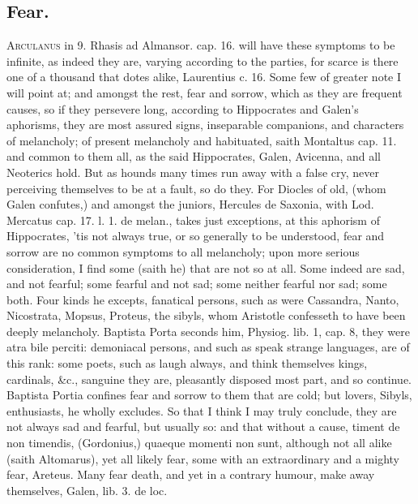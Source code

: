 {\subsection{Fear.}
\lettrine{A}{rculanus} in 9. Rhasis ad Almansor. cap. 16. will have these
symptoms to be infinite, as indeed they are, varying according to the
parties, for scarce is there one of a thousand that dotes alike, 
Laurentius c. 16. Some few of greater note I will point at; and amongst
the rest, fear and sorrow, which as they are frequent causes, so if
they persevere long, according to Hippocrates and Galen's
aphorisms, they are most assured signs, inseparable companions, and
characters of melancholy; of present melancholy and habituated, saith
Montaltus cap. 11. and common to them all, as the said Hippocrates,
Galen, Avicenna, and all Neoterics hold. But as hounds many times run
away with a false cry, never perceiving themselves to be at a fault, so
do they. For Diocles of old, (whom Galen confutes,) and amongst the
juniors, Hercules de Saxonia, with Lod. Mercatus cap. 17. l. 1.
de melan., takes just exceptions, at this aphorism of Hippocrates, 'tis
not always true, or so generally to be understood, fear and sorrow are
no common symptoms to all melancholy; upon more serious consideration,
I find some (saith he) that are not so at all. Some indeed are sad, and
not fearful; some fearful and not sad; some neither fearful nor sad;
some both. Four kinds he excepts, fanatical persons, such as were
Cassandra, Nanto, Nicostrata, Mopsus, Proteus, the sibyls, whom
Aristotle confesseth to have been deeply melancholy. Baptista
Porta seconds him, Physiog. lib. 1, cap. 8, they were atra bile
perciti: demoniacal persons, and such as speak strange languages, are
of this rank: some poets, such as laugh always, and think themselves
kings, cardinals, \&c., sanguine they are, pleasantly disposed most
part, and so continue. Baptista Portia confines fear and sorrow
to them that are cold; but lovers, Sibyls, enthusiasts, he wholly
excludes. So that I think I may truly conclude, they are not always sad
and fearful, but usually so: and that without a cause, timent de
non timendis, (Gordonius,) quaeque momenti non sunt, although not all
alike (saith Altomarus), yet all likely fear, some with an
extraordinary and a mighty fear, Areteus. Many fear death, and
yet in a contrary humour, make away themselves, Galen, lib. 3. de loc.
}
